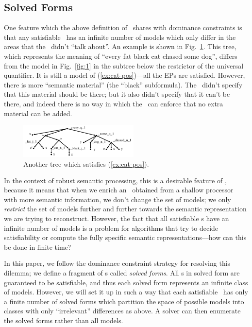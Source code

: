 \subsection{Solved Forms}

One feature which the above definition of \rmrs\ shares with dominance
constraints is that any satisfiable \rmrs\ has an infinite number of
models which only differ in the areas that the \rmrs\ didn't ``talk
about''.  An example is shown in Fig.~\ref{fig:fat-black-cat}.  This
tree, which represents the meaning of ``every fat black cat chased
some dog'', differs from the model in Fig.~\ref{fig:1} in the subtree
below the restrictor of the universal quantifier.  It is still a model
of (\ref{ex:cat-pos})---all the EPs are satisfied.  However, there is
more ``semantic material'' (the ``black'' subformula).  The \rmrs\
didn't specify that this material should be there; but it also didn't
specify that it can't be there, and indeed there is no way in which
the \rmrs\ can enforce that no extra material can be added.


\begin{figure}
  \centering
  \includegraphics[width=6cm]{pic-more-stuff}
  \caption{Another tree which satisfies (\ref{ex:cat-pos}).}
  \label{fig:fat-black-cat}
\end{figure}


In the context of robust semantic processing, this is a desirable
feature of \rmrs, because it means that when we enrich an \rmrs\
obtained from a shallow processor with more semantic information, we
don't change the set of models; we only \emph{restrict} the set of
models further and further towards the semantic representation we are
trying to reconstruct.  However, the fact that all satisfiable \rmrs s
have an infinite number of models is a problem for algorithms that try
to decide satisfiability or compute the fully specific semantic
representations---how can this be done in finite time?

In this paper, we follow the dominance constraint strategy for
resolving this dilemma; we
define a fragment of \rmrs s called \emph{solved forms}.  All \rmrs
s in solved form are guaranteed to be satisfiable, and thus each
solved form represents an infinite class of models.  However, we will
set it up in such a way that each satisfiable \rmrs\ has only a finite
number of solved forms which partition the space of possible models
into classes with only ``irrelevant'' differences as above.  A solver
can then enumerate the solved forms rather than all models.

